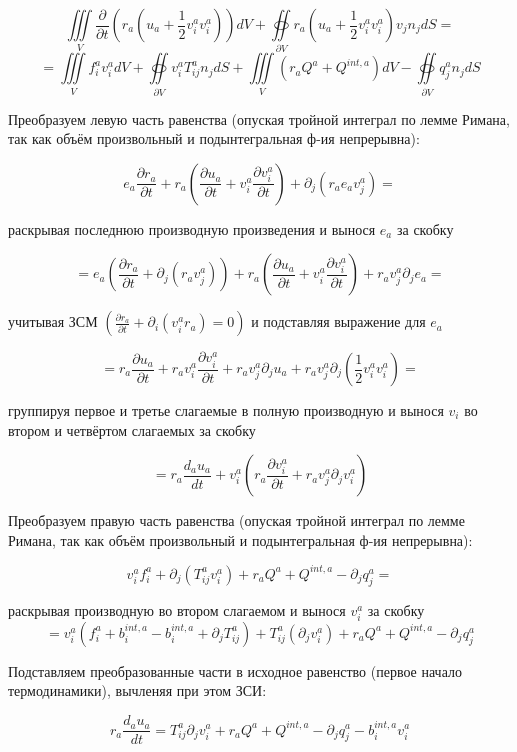 \documentclass[main.tex]{subfiles}
\begin{document}
$$\iiint\limits_{V}{\frac{\partial}{\partial t}\left(r_a\left(u_a+\frac{1}{2}v_i^av_i^a\right)\right)dV}+\oiint\limits_{\partial V}{r_a\left(u_a+\frac{1}{2} v_i^a v_i^a\right)v_j n_j dS}=$$ $$=\iiint\limits_{V}{f_i^a v_i^a dV}+\oiint\limits_{\partial V}{v_i^aT_{ij}^an_jdS}+\iiint\limits_{V}{\left(r_aQ^a+Q^{int,a}\right)dV}-\oiint\limits_{\partial V}q_j^a n_j dS$$

Преобразуем левую часть равенства (опуская тройной интеграл по лемме Римана, так как объём произвольный и подынтегральная ф-ия непрерывна):

$$e_a\frac{\partial r_a}{\partial t}+r_a\left(\frac{\partial u_a}{\partial t}+v_i^a\frac{\partial v_i^a}{\partial t}\right)+\partial_j\left(r_ae_av_j^a\right)=$$

раскрывая последнюю производную произведения и вынося $e_a$ за скобку

$$=e_a\left(\frac{\partial r_a}{\partial t}+\partial_j\left(r_av_j^a\right)\right)+r_a\left(\frac{\partial u_a}{\partial t}+v_i^a\frac{\partial v_i^a}{\partial t}\right)+r_av_j^a\partial_{j}e_a=$$

учитывая ЗСМ $\displaystyle{}\left(\frac{\partial r_{a}}{\partial t}+\partial_i\left(v_i^a r_a\right)=0\right)$ и подставляя выражение для $e_a$

$$=r_a\frac{\partial u_a}{\partial t}+r_av_i^a\frac{\partial v_i^a}{\partial t}+r_av_j^a\partial_j u_a+r_av_j^a\partial_j\left(\frac{1}{2}v_i^av_i^a\right)=$$

группируя первое и третье слагаемые в полную производную и вынося $v_i$ во втором и четвёртом слагаемых за скобку

$$=r_a\frac{d_au_a}{dt}+v_i^a\left(r_a\frac{\partial v_i^a}{\partial t}+r_av_j^a\partial_j v_i^a\right)$$

Преобразуем правую часть равенства (опуская тройной интеграл по лемме Римана, так как объём произвольный и подынтегральная ф-ия непрерывна):

$$v_i^af_i^a+\partial_j\left(T_{ij}^av_i^a\right)+r_a Q^a+Q^{int,a}-\partial_jq_j^a=$$

раскрывая производную во втором слагаемом и вынося $v_i^a$ за скобку
$$=v_i^a\left(f_i^a+b_i^{int,a}-b_i^{int,a}+\partial_jT_{ij}^a\right)+T_{ij}^a\left(\partial_jv_i^a\right)+r_aQ^a+Q^{int,a}-\partial_jq_j^a$$

Подставляем преобразованные части в исходное равенство (первое начало термодинамики), вычленяя при этом ЗСИ:

$$r_a\frac{d_au_a}{dt}=T_{ij}^a\partial_jv_i^a+r_aQ^a+Q^{int,a}-\partial_jq_j^a-b_i^{int,a}v_i^a$$
\end{document}
